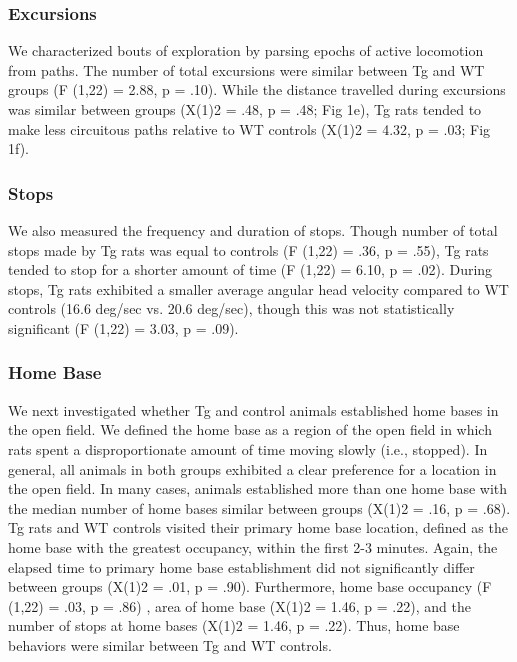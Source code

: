 \documentclass[fleqn,10pt]{wlscirep}
\begin{document}
\subsubsection*{Excursions}
We characterized bouts of exploration by parsing epochs of active locomotion from paths. The number of total excursions were similar between Tg and WT groups (F (1,22) = 2.88, p = .10). While the distance travelled during excursions was similar between groups (X(1)2 = .48, p = .48; Fig 1e), Tg rats tended to make less circuitous paths relative to WT controls (X(1)2 = 4.32, p = .03; Fig 1f).

\subsubsection*{Stops} We also measured the frequency and duration of stops. Though number of total stops made by Tg rats was equal to controls (F (1,22) = .36, p = .55), Tg rats tended to stop for a shorter amount of time (F (1,22) = 6.10, p = .02). During stops, Tg rats exhibited a smaller average angular head velocity compared to WT controls (16.6 deg/sec vs. 20.6 deg/sec), though this was not statistically significant (F (1,22) = 3.03, p = .09). 

\subsubsection*{Home Base} We next investigated whether Tg and control animals established home bases in the open field. We defined the home base as a region of the open field in which rats spent a disproportionate amount of time moving slowly (i.e., stopped). In general, all animals in both groups exhibited a clear preference for a location in the open field. In many cases, animals established more than one home base with the median number of home bases similar between groups (X(1)2 = .16, p = .68). Tg rats and WT controls visited their primary home base location, defined as the home base with the greatest occupancy, within the first 2-3 minutes. Again, the elapsed time to primary home base establishment did not significantly differ between groups (X(1)2 = .01, p = .90). Furthermore, home base occupancy (F (1,22) = .03, p = .86) , area of home base (X(1)2 = 1.46, p = .22), and the number of stops at home bases (X(1)2 = 1.46, p = .22). Thus, home base behaviors were similar between Tg and WT controls. 
\end{document}
